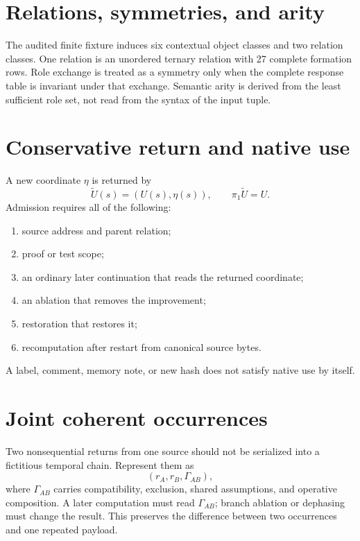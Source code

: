 \documentclass[11pt,a4paper]{article}
\begin{document}
\section{Relations, symmetries, and arity}
The audited finite fixture induces six contextual object classes and two relation classes. One relation is an unordered ternary relation with 27 complete formation rows. Role exchange is treated as a symmetry only when the complete response table is invariant under that exchange. Semantic arity is derived from the least sufficient role set, not read from the syntax of the input tuple.

\section{Conservative return and native use}
A new coordinate $\eta$ is returned by
\begin{equation}
\widetilde U(s)=(U(s),\eta(s)),\qquad \pi_1\widetilde U=U.
\end{equation}
Admission requires all of the following:
\begin{enumerate}
\item source address and parent relation;
\item proof or test scope;
\item an ordinary later continuation that reads the returned coordinate;
\item an ablation that removes the improvement;
\item restoration that restores it;
\item recomputation after restart from canonical source bytes.
\end{enumerate}
A label, comment, memory note, or new hash does not satisfy native use by itself.

\section{Joint coherent occurrences}
Two nonsequential returns from one source should not be serialized into a fictitious temporal chain. Represent them as
\begin{equation}
(r_A,r_B,\Gamma_{AB}),
\end{equation}
where $\Gamma_{AB}$ carries compatibility, exclusion, shared assumptions, and operative composition. A later computation must read $\Gamma_{AB}$; branch ablation or dephasing must change the result. This preserves the difference between two occurrences and one repeated payload.
\end{document}

